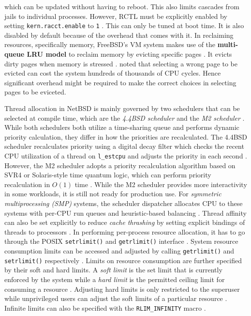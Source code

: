 which can be updated without having to reboot. This also limits cascades from jails to individual processes. However, RCTL
must be explicitly enabled by setting \texttt{kern.racct.enable} to \texttt{1} \parencite{freebsd_resource_limits}. This
can only be tuned at boot time. It is also disabled by default because of the overhead that comes with it.
In reclaiming resources, specifically memory, FreeBSD's VM system makes use of the \textbf{multi-queue LRU model} to reclaim memory
by evicting specific pages \parencite{dillon}. It evicts dirty pages when memory is stressed \parencite{dillon}. \textcite{dillon}
noted that selecting a wrong page to be evicted can cost the system hundreds of thousands of CPU cycles. Hence significant
overhead might be required to make the correct choices in selecting pages to be eviceted.

Thread allocation in NetBSD is mainly governed by two schedulers that can be selected at compile time, which are the \textit{4.4BSD
	scheduler} and the \textit{M2 scheduler} \parencite{netbsd_internals}. While both schedulers both utilize a time-sharing queue
and performs dynamic priority calculation, they differ in how the priorities are recalculated. The 4.4BSD scheduler recalculates
priority using a digital decay filter which checks the recent CPU utilization of a thread on \texttt{l\_estcpu} and adjusts
the priority in each second \parencite{netbsd_internals}. However, the M2 scheduler adopts a priority recalculation algorithm
based on SVR4 or Solaris-style time quantum logic, which can perform priority recalculation in $O(1)$ time \parencite{netbsd_internals}.
While the M2 scheduler provides more interactivity in some workloads, it is still not ready for production use. For \textit{symmetric
	multiprocessing (SMP)} systems, the scheduler dispatcher allocates CPU to these systems with per-CPU run queues and heuristic-based
balancing \parencite{rasiukevicius2009}. Thread affinity can also be set explicitly to reduce \textit{cache thrashing} by
setting explicit bindings of threads to processors \parencite{rasiukevicius2009}. In performing per-process resource allocation,
it has to go through the POSIX \texttt{setrlimit()} and \texttt{getrlimit()} interface \parencite{netbsd_setrlimit}. System resource
consumption limits can be accessed and adjusted by calling \texttt{getrlimit()} and \texttt{setrlimit()} respectively \parencite{netbsd_setrlimit}.
Limits on resource consumption are further specified by their soft and hard limits. A \textit{soft limit} is the set limit that
is currently enforced by the system while a \textit{hard limit} is the permitted ceiling limit for consuming a resource
\parencite{netbsd_setrlimit}. Adjusting hard limits is only restricted to the superuser while unprivileged users can adjust
the soft limits of a particular resource \parencite{netbsd_setrlimit}. Infinite limits can also be specified with the
\texttt{RLIM\_INFINITY} macro \parencite{netbsd_setrlimit}.

